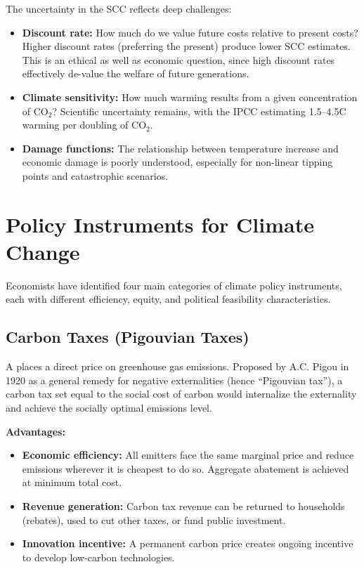 The uncertainty in the SCC reflects deep challenges:
\begin{itemize}
  \item \textbf{Discount rate:} How much do we value future costs relative to present costs? Higher discount rates (preferring the present) produce lower SCC estimates. This is an ethical as well as economic question, since high discount rates effectively de-value the welfare of future generations.
  \item \textbf{Climate sensitivity:} How much warming results from a given concentration of CO$_2$? Scientific uncertainty remains, with the IPCC estimating 1.5--4.5\textdegree C warming per doubling of CO$_2$.
  \item \textbf{Damage functions:} The relationship between temperature increase and economic damage is poorly understood, especially for non-linear tipping points and catastrophic scenarios.
\end{itemize}

\section{Policy Instruments for Climate Change}

Economists have identified four main categories of climate policy instruments, each with different efficiency, equity, and political feasibility characteristics.

\subsection{Carbon Taxes (Pigouvian Taxes)}

A  places a direct price on greenhouse gas emissions. Proposed by A.C. Pigou in 1920 as a general remedy for negative externalities (hence ``Pigouvian tax''), a carbon tax set equal to the social cost of carbon would internalize the externality and achieve the socially optimal emissions level.

\textbf{Advantages:}
\begin{itemize}
  \item \textbf{Economic efficiency:} All emitters face the same marginal price and reduce emissions wherever it is cheapest to do so. Aggregate abatement is achieved at minimum total cost.
  \item \textbf{Revenue generation:} Carbon tax revenue can be returned to households (rebates), used to cut other taxes, or fund public investment.
  \item \textbf{Innovation incentive:} A permanent carbon price creates ongoing incentive to develop low-carbon technologies.
\end{itemize}

